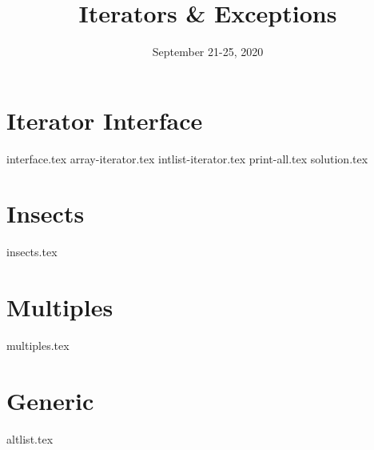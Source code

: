 \documentclass[11pt]{exam}
\title{Iterators \& Exceptions}
\date{September 21-25, 2020}
\begin{document}
\maketitle

\section{Iterator Interface}
\begin{questions}
{interface.tex}
{array-iterator.tex}
{intlist-iterator.tex}
{print-all.tex}
{solution.tex}
\end{questions}

\clearpage

\section{Insects}
\begin{questions}
{insects.tex}
\end{questions}
\clearpage

\section{Multiples}
\begin{questions}
{multiples.tex}
\end{questions}
\clearpage

\section{Generic}

\begin{questions}
{altlist.tex}
\end{questions}
\clearpage
\end{document}
